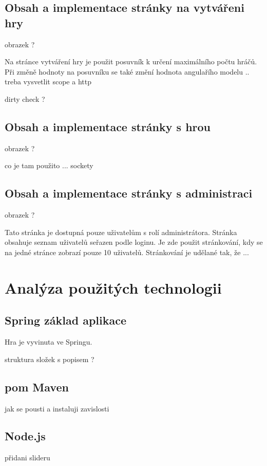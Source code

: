 \documentclass[czech,master,public,dept460,male,cpdeclaration,twoside]{diploma}
\begin{document}
\subsection{Obsah a implementace stránky na vytvářeni hry}
obrazek ? 

Na stránce vytváření hry je použit posuvník k určení maximálního počtu hráčů. Při změně hodnoty na posuvníku se také změní hodnota angulařího modelu .. treba vysvetlit scope a http

dirty check ?


\subsection{Obsah a implementace stránky s hrou}
obrazek ?

co je tam použito ... sockety

\subsection{Obsah a implementace stránky s administraci}
obrazek ?

Tato stránka je dostupná pouze uživatelům s rolí administrátora. Stránka obsahuje seznam uživatelů seřazen podle loginu. Je zde použit stránkování, kdy se na jedné stránce zobrazí pouze 10 uživatelů.
Stránkování je udělané tak, že ...

\section{Analýza použitých technologii}
\subsection{Spring základ aplikace}
Hra je vyvinuta ve Springu.

struktura složek s popisem ?
 
\subsection{pom Maven}
jak se pousti a instaluji zavislosti

\subsection{Node.js}
přidani slideru
\end{document}
